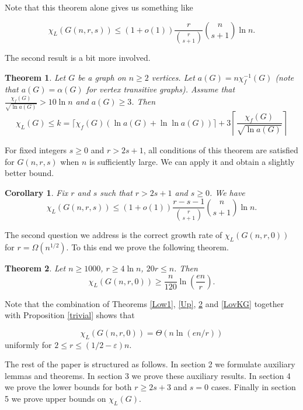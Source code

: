 \documentclass[10pt,a4paper]{article}
\newtheorem{theorem}{Theorem}
\newtheorem{corollary}{Corollary}[section]
\theoremstyle{remark}
\theoremstyle{definition}
\newcommand{\skob}[1]{\left(#1\right)}
\begin{document}
Note that this theorem alone gives us something like 

$$
    \chi_L(G(n,r,s)) \leq (1+o(1))\frac{r}{\binom{r}{s+1}}\binom{n}{s+1}\ln n.
$$

The second result is a bit more involved.

\begin{theorem}
    \label{UB2}
    Let $G$ be a graph on $n \geq 2$ vertices. Let $a(G) = n\chi^{-1}_f(G)$ (note that $a(G) = \alpha(G)$ for vertex transitive graphs). Assume that $\frac{\chi_f(G)}{\sqrt{\ln a(G)}} > 10\ln n$ and $a(G) \geq 3$. Then
    $$
        \chi_L(G) \leq k = \lceil\chi_f(G)\skob{\ln a(G) + \ln \ln a(G)}\rceil + 3\left\lceil\frac{\chi_f(G)}{\sqrt{\ln a(G)}}\right\rceil
    $$
\end{theorem}

For fixed integers $s \geq 0$ and $r > 2s+1$, all conditions of this theorem are satisfied for $G(n,r,s)$ when $n$ is sufficiently large. We can apply it and obtain a slightly better bound.

\begin{corollary}    
    Fix $r$ and $s$ such that $r > 2s+1$ and $s \geq 0$. We have 
    $$
        \chi_L(G(n,r,s)) \leq (1+o(1))\frac{r-s-1}{\binom{r}{s+1}}\binom{n}{s+1}\ln n.
    $$
\end{corollary}


The second question we address is the correct growth rate of $\chi_L(G(n,r,0))$ for $r = \Omega(n^{1/2})$. To this end we prove the following theorem.


\begin{theorem}
    \label{main_kgnr}
	Let $n \geq 1000$, $r \geq 4\ln n$, $20r \leq n$. Then
	$$
		\chi_L(G(n,r,0)) \geq \frac{n}{120}\ln\skob{\frac{en}{r}}.
	$$
\end{theorem}


Note that the combination of Theorems \ref{Low1}, \ref{Up}, \ref{main_kgnr} and \ref{LovKG} together with Proposition \ref{trivial} shows that 

$$ 
    \chi_L(G(n,r,0)) = \Theta\skob{n\ln\skob{en/r}}
$$
uniformly for $2 \leq r \leq (1/2 - \varepsilon)n$.

The rest of the paper is structured as follows. In section 2 we formulate auxiliary lemmas and theorems. In section 3 we prove these auxiliary results. In section 4 we prove the lower bounds for both $r \geq 2s+3$ and $s = 0$ cases. Finally in section 5 we prove upper bounds on $\chi_L(G)$.


\end{document}
